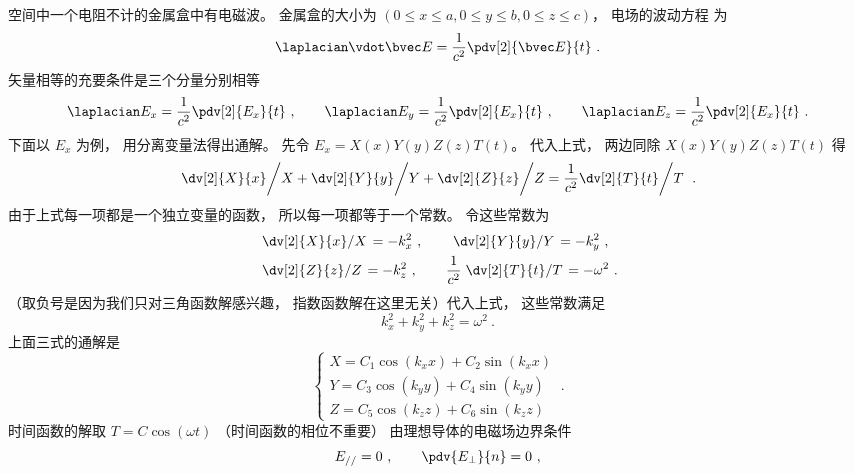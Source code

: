 

空间中一个电阻不计的金属盒中有电磁波。 金属盒的大小为 $(0 \leqslant x \leqslant a, 0 \leqslant y \leqslant b, 0 \leqslant z \leqslant c)$， 电场的波动方程%
为
\begin{equation}
\laplacian \vdot \bvec E = \frac{1}{c^2} \pdv[2]{\bvec E}{t}~.
\end{equation}  
矢量相等的充要条件是三个分量分别相等
\begin{equation}
\laplacian E_x = \frac{1}{c^2} \pdv[2]{E_x}{t} ~,\qquad
\laplacian E_y = \frac{1}{c^2} \pdv[2]{E_x}{t} ~,\qquad
\laplacian E_z = \frac{1}{c^2} \pdv[2]{E_x}{t}~.
\end{equation}   
下面以 $E_x$ 为例， 用分离变量法得出通解。
先令 $E_x = X(x) Y(y) Z(z) T(t)$。 代入上式， 两边同除 $X(x) Y(y) Z(z) T(t)$ 得
\begin{equation}
\left. \dv[2]{X}{x} \middle/ X + \dv[2]{Y}{y} \middle/ Y + \dv[2]{Z}{z} \middle/ Z  = \frac{1}{c^2}  \dv[2]{T}{t} \middle/ T\right.~.
\end{equation}
由于上式每一项都是一个独立变量的函数， 所以每一项都等于一个常数。 令这些常数为
\begin{equation}\begin{aligned}
&\left. \dv[2]{X}{x} \middle/ X \right. = -k_x^2 ~,\qquad
\left. \dv[2]{Y}{y} \middle/ Y \right. = -k_y^2~,\\
&\left. \dv[2]{Z}{z} \middle/ Z \right. = -k_z^2 ~,\qquad
\frac{1}{c^2} \left. \dv[2]{T}{t} \middle/ T \right. = -\omega^2~.
\end{aligned}\end{equation}
（取负号是因为我们只对三角函数解感兴趣， 指数函数解在这里无关）代入上式， 这些常数满足
\begin{equation}
k_x^2 + k_y^2 + k_z^2 = \omega ^2~.
\end{equation} 
上面三式的通解是
\begin{equation}
\begin{cases}
X = C_1\cos(k_x x) + C_2\sin(k_x x)\\
Y = C_3\cos(k_y y) + C_4\sin(k_y y)\\
Z = C_5\cos(k_z z) + C_6\sin(k_z z)
\end{cases}~.
\end{equation} 
时间函数的解取 $T = C\cos(\omega t)$ （时间函数的相位不重要）
由理想导体的电磁场边界条件%
\begin{equation}
E_{//} = 0  ~,\qquad  \pdv{E_\bot}{n} = 0~,
\end{equation}  
